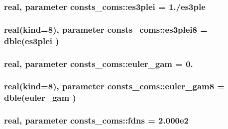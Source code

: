 \subsubsection[{\texorpdfstring{es3plei}{es3plei}}]{\setlength{\rightskip}{0pt plus 5cm}real, parameter consts\+\_\+coms\+::es3plei = 1./{\bf es3ple}}\hypertarget{namespaceconsts__coms_ae5b40232ff74fe2d9258b854fe070dc6}{}\label{namespaceconsts__coms_ae5b40232ff74fe2d9258b854fe070dc6}
\subsubsection[{\texorpdfstring{es3plei8}{es3plei8}}]{\setlength{\rightskip}{0pt plus 5cm}real(kind=8), parameter consts\+\_\+coms\+::es3plei8 = dble({\bf es3plei} )}\hypertarget{namespaceconsts__coms_aca52530455d0c1b8063f2f30a3366291}{}\label{namespaceconsts__coms_aca52530455d0c1b8063f2f30a3366291}
\subsubsection[{\texorpdfstring{euler\+\_\+gam}{euler_gam}}]{\setlength{\rightskip}{0pt plus 5cm}real, parameter consts\+\_\+coms\+::euler\+\_\+gam = 0.}\hypertarget{namespaceconsts__coms_aba6e0fb8ee2b35386bc108bca41f91d4}{}\label{namespaceconsts__coms_aba6e0fb8ee2b35386bc108bca41f91d4}
\subsubsection[{\texorpdfstring{euler\+\_\+gam8}{euler_gam8}}]{\setlength{\rightskip}{0pt plus 5cm}real(kind=8), parameter consts\+\_\+coms\+::euler\+\_\+gam8 = dble({\bf euler\+\_\+gam} )}\hypertarget{namespaceconsts__coms_a61bc1f477f05d4493fec0947a2c52272}{}\label{namespaceconsts__coms_a61bc1f477f05d4493fec0947a2c52272}
\subsubsection[{\texorpdfstring{fdns}{fdns}}]{\setlength{\rightskip}{0pt plus 5cm}real, parameter consts\+\_\+coms\+::fdns = 2.\+000e2}\hypertarget{namespaceconsts__coms_a410d70e87edda0633a3eae3390fb500e}{}\label{namespaceconsts__coms_a410d70e87edda0633a3eae3390fb500e}
